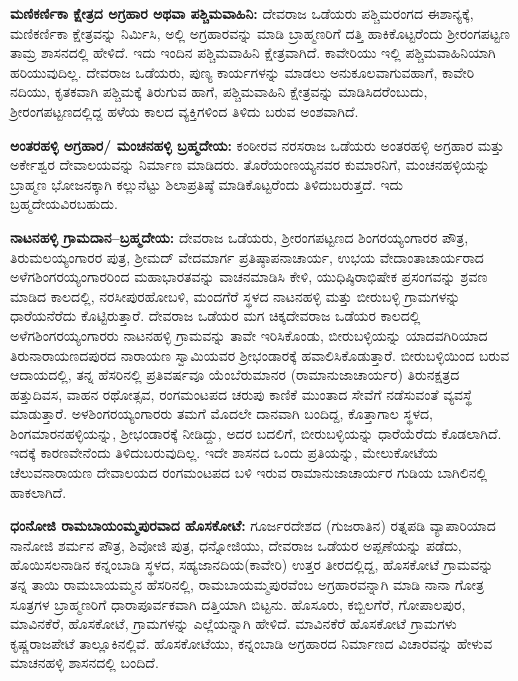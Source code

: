 \textbf{ಮಣಿಕರ್ಣಿಕಾ ಕ್ಷೇತ್ರದ ಅಗ್ರಹಾರ ಅಥವಾ ಪಶ್ಚಿಮವಾಹಿನಿ:} ದೇವರಾಜ ಒಡೆಯರು ಪಶ್ಚಿಮರಂಗದ ಈಶಾನ್ಯಕ್ಕೆ, ಮಣಿಕರ್ಣಿಕಾ ಕ್ಷೇತ್ರವನ್ನು ನಿರ್ಮಿಸಿ, ಅಲ್ಲಿ ಅಗ್ರಹಾರವನ್ನು ಮಾಡಿ ಬ್ರಾಹ್ಮಣರಿಗೆ ದತ್ತಿ ಹಾಕಿಕೊಟ್ಟರೆಂದು ಶ‍್ರೀರಂಗಪಟ್ಟಣ ತಾಮ್ರ ಶಾಸನದಲ್ಲಿ ಹೇಳಿದೆ.  ಇದು ಇಂದಿನ ಪಶ್ಚಿಮವಾಹಿನಿ ಕ್ಷೇತ್ರವಾಗಿದೆ. ಕಾವೇರಿಯು ಇಲ್ಲಿ ಪಶ್ಚಿಮವಾಹಿನಿಯಾಗಿ ಹರಿಯುವುದಿಲ್ಲ. ದೇವರಾಜ ಒಡೆಯರು, ಪುಣ್ಯ ಕಾರ್ಯಗಳನ್ನು ಮಾಡಲು ಅನುಕೂಲವಾಗುವಹಾಗೆ, ಕಾವೇರಿ ನದಿಯು, ಕೃತಕವಾಗಿ ಪಶ್ಚಿಮಕ್ಕೆ ತಿರುಗುವ ಹಾಗೆ, ಪಶ್ಚಿಮವಾಹಿನಿ ಕ್ಷೇತ್ರವನ್ನು ಮಾಡಿಸಿದರೆಂಬುದು, ಶ‍್ರೀರಂಗಪಟ್ಟಣದಲ್ಲಿದ್ದ ಹಳೆಯ ಕಾಲದ ವ್ಯಕ್ತಿಗಳಿಂದ ತಿಳಿದು ಬರುವ ಅಂಶವಾಗಿದೆ. 

\textbf{ಅಂತರಹಳ್ಳಿ ಅಗ್ರಹಾರ/ ಮಂಚನಹಳ್ಳಿ ಬ್ರಹ್ಮದೇಯ:} ಕಂಠೀರವ ನರಸರಾಜ ಒಡೆಯರು ಅಂತರಹಳ್ಳಿ ಅಗ್ರಹಾರ ಮತ್ತು ಅರ್ಕೇಶ್ವರ ದೇವಾಲಯವನ್ನು ನಿರ್ಮಾಣ ಮಾಡಿದರು. ತೊರೆಯಂಣಯ್ಯನವರ ಕುಮಾರನಿಗೆ, ಮಂಚನಹಳ್ಳಿಯನ್ನು ಬ್ರಾಹ್ಮಣ ಭೋಜನಕ್ಕಾಗಿ ಕಲ್ಲುನೆಟ್ಟು ಶಿಲಾಪ್ರತಿಷ್ಠೆ ಮಾಡಿಕೊಟ್ಟರೆಂದು ತಿಳಿದುಬರುತ್ತದೆ.  ಇದು ಬ್ರಹ್ಮದೇಯವಿರಬಹುದು.

\textbf{ನಾಟನಹಳ್ಳಿ ಗ್ರಾಮದಾನ–ಬ್ರಹ್ಮದೇಯ:} ದೇವರಾಜ ಒಡೆಯರು, ಶ‍್ರೀರಂಗಪಟ್ಟಣದ ಶಿಂಗರಯ್ಯಂಗಾರರ ಪೌತ್ರ, ತಿರುಮಲಯ್ಯಂಗಾರರ ಪುತ್ರ, ಶ‍್ರೀಮದ್​ ವೇದಮಾರ್ಗ ಪ್ರತಿಷ್ಠಾಪನಾಚಾರ್ಯ, ಉಭಯ ವೇದಾಂತಾಚಾರ್ಯರಾದ ಅಳೆಗಶಿಂಗರಯ್ಯಂಗಾರರಿಂದ ಮಹಾಭಾರತವನ್ನು ವಾಚನಮಾಡಿಸಿ ಕೇಳಿ, ಯುಧಿಷ್ಠಿರಾಭಿಷೇಕ ಪ್ರಸಂಗವನ್ನು ಶ್ರವಣ ಮಾಡಿದ ಕಾಲದಲ್ಲಿ, ನರಸೀಪುರಹೋಬಳಿ, ಮಂದಗೆರೆ ಸ್ಥಳದ ನಾಟನಹಳ್ಳಿ ಮತ್ತು ಬೀರುಬಳ್ಳಿ ಗ್ರಾಮಗಳನ್ನು ಧಾರೆಯನೆರೆದು ಕೊಟ್ಟಿರುತ್ತಾರೆ. ದೇವರಾಜ ಒಡೆಯರ ಮಗ ಚಿಕ್ಕದೇವರಾಜ ಒಡೆಯರ ಕಾಲದಲ್ಲಿ ಅಳೆಗಶಿಂಗರಯ್ಯಂಗಾರರು ನಾಟನಹಳ್ಳಿ ಗ್ರಾಮವನ್ನು ತಾವೇ ಇರಿಸಿಕೊಂಡು, ಬೀರುಬಳ್ಳಿಯನ್ನು ಯಾದವಗಿರಿಯಾದ ತಿರುನಾರಾಯಣದಪುರದ ನಾರಾಯಣ ಸ್ವಾಮಿಯವರ ಶ‍್ರೀಭಂಡಾರಕ್ಕೆ ಹವಾಲಿಸಿಕೊಡುತ್ತಾರೆ. ಬೀರುಬಳ್ಳಿಯಿಂದ ಬರುವ ಆದಾಯದಲ್ಲಿ, ತನ್ನ ಹೆಸರಿನಲ್ಲಿ ಪ್ರತಿವರ್ಷವೂ ಯೆಂಬೆರುಮಾನರ (ರಾಮಾನುಜಾಚಾರ್ಯರ) ತಿರುನಕ್ಷತ್ರದ ಹತ್ತುದಿವಸ, ವಾಹನ ರಥೋತ್ಸವ, ರಂಗಮಂಟಪದ ಚರುಪು ಕಾಣಿಕೆ ಮುಂತಾದ ಸೇವೆಗೆ ನಡೆಸುವಂತೆ ವ್ಯವಸ್ಥೆ ಮಾಡುತ್ತಾರೆ. ಅಳಶಿಂಗರಯ್ಯಂಗಾರರು ತಮಗೆ ಮೊದಲೇ ದಾನವಾಗಿ ಬಂದಿದ್ದ, ಕೊತ್ತಾಗಾಲ ಸ್ಥಳದ, ಶಿಂಗಮಾರನಹಳ್ಳಿಯನ್ನು, ಶ‍್ರೀಭಂಡಾರಕ್ಕೆ ನೀಡಿದ್ದು, ಅದರ ಬದಲಿಗೆ, ಬೀರುಬಳ್ಳಿಯನ್ನು ಧಾರೆಯೆರೆದು ಕೊಡಲಾಗಿದೆ. ಇದಕ್ಕೆ ಕಾರಣವೇನೆಂದು ತಿಳಿದುಬರುವುದಿಲ್ಲ.  ಇದೇ ಶಾಸನದ ಒಂದು ಪ್ರತಿಯನ್ನು, ಮೇಲುಕೋಟೆಯ ಚೆಲುವನಾರಾಯಣ ದೇವಾಲಯದ ರಂಗಮಂಟಪದ ಬಳಿ ಇರುವ ರಾಮಾನುಜಾಚಾರ್ಯರ ಗುಡಿಯ ಬಾಗಿಲಿನಲ್ಲಿ ಹಾಕಲಾಗಿದೆ.

\textbf{ಧಂನೋಜಿ ರಾಮಬಾಯಂಮ್ಮಪುರವಾದ ಹೊಸಕೋಟೆ:} ಗೂರ್ಜರದೇಶದ (ಗುಜರಾತಿನ) ರತ್ನಪಡಿ ವ್ಯಾಪಾರಿಯಾದ ನಾನೋಜಿ ಶರ್ಮನ ಪೌತ್ರ, ಶಿವೋಜಿ ಪುತ್ರ, ಧನ್ನೋಜಿಯು, ದೇವರಾಜ ಒಡೆಯರ ಅಪ್ಪಣೆಯನ್ನು ಪಡೆದು, ಹೊಯಿಸಲನಾಡಿನ ಕನ್ನಂಬಾಡಿ ಸ್ಥಳದ, ಸಹ್ಯಜಾನದಿಯ(ಕಾವೇರಿ) ಉತ್ತರ ತೀರದಲ್ಲಿದ್ದ, ಹೊಸಕೋಟೆ ಗ್ರಾಮವನ್ನು ತನ್ನ ತಾಯಿ ರಾಮಬಾಯಮ್ಮನ ಹೆಸರಿನಲ್ಲಿ, ರಾಮಬಾಯಮ್ಮಪುರವೆಂಬ ಅಗ್ರಹಾರವನ್ನಾಗಿ ಮಾಡಿ ನಾನಾ ಗೋತ್ರ ಸೂತ್ರಗಳ ಬ್ರಾಹ್ಮಣರಿಗೆ ಧಾರಾಪೂರ್ವಕವಾಗಿ ದತ್ತಿಯಾಗಿ ಬಿಟ್ಟನು. ಹೊಸೂರು, ಕಬ್ಬಿಲಗೆರೆ, ಗೋಪಾಲಪುರ, ಮಾವಿನಕೆರೆ, ಹೊಸಕೋಟೆ, ಗ್ರಾಮಗಳನ್ನು ಎಲ್ಲೆಯನ್ನಾಗಿ ಹೇಳಿದೆ. ಮಾವಿನಕೆರೆ ಹೊಸಕೋಟೆ ಗ್ರಾಮಗಳು ಕೃಷ್ಣರಾಜಪೇಟೆ ತಾಲ್ಲೂಕಿನಲ್ಲಿವೆ. ಹೊಸಕೋಟೆಯು, ಕನ್ನಂಬಾಡಿ ಅಗ್ರಹಾರದ ನಿರ್ಮಾಣದ ವಿಚಾರವನ್ನು ಹೇಳುವ ಮಾಚನಹಳ್ಳಿ ಶಾಸನದಲ್ಲಿ ಬಂದಿದೆ. 

